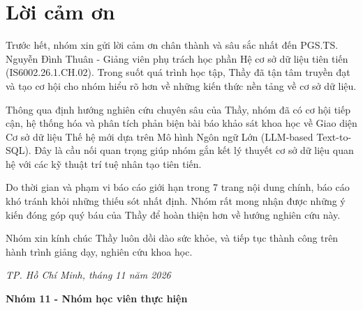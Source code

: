 \chapter*{Lời cảm ơn}
Trước hết, nhóm xin gửi lời cảm ơn chân thành và sâu sắc nhất đến PGS.TS. Nguyễn Đình Thuân - Giảng viên phụ trách học phần Hệ cơ sở dữ liệu tiên tiến (IS6002.26.1.CH.02). Trong suốt quá trình học tập, Thầy đã tận tâm truyền đạt và tạo cơ hội cho nhóm hiểu rõ hơn về những kiến thức nền tảng về cơ sở dữ liệu.

Thông qua định hướng nghiên cứu chuyên sâu của Thầy, nhóm đã có cơ hội tiếp cận, hệ thống hóa và phân tích phản biện bài báo khảo sát khoa học về Giao diện Cơ sở dữ liệu Thế hệ mới dựa trên Mô hình Ngôn ngữ Lớn (LLM-based Text-to-SQL). Đây là cầu nối quan trọng giúp nhóm gắn kết lý thuyết cơ sở dữ liệu quan hệ với các kỹ thuật trí tuệ nhân tạo tiên tiến.

Do thời gian và phạm vi báo cáo giới hạn trong 7 trang nội dung chính, báo cáo khó tránh khỏi những thiếu sót nhất định. Nhóm rất mong nhận được những ý kiến đóng góp quý báu của Thầy để hoàn thiện hơn về hướng nghiên cứu này.

Nhóm xin kính chúc Thầy luôn dồi dào sức khỏe, và tiếp tục thành công trên hành trình giảng dạy, nghiên cứu khoa học.

\emph{TP. Hồ Chí Minh, tháng 11 năm 2026}

\textbf{Nhóm 11 - Nhóm học viên thực hiện}

